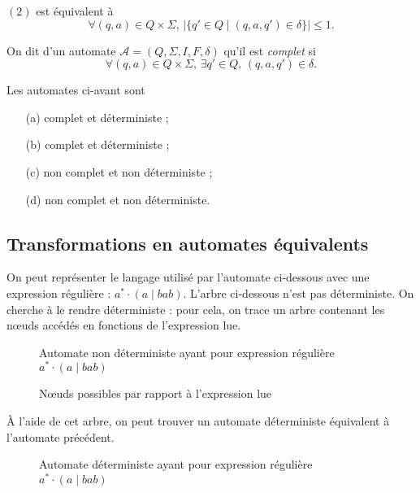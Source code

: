 \begin{rmk}
	$(2)$\/ est équivalent à \[
		\forall (q,a) \in Q \times \Sigma,\,\big|\{q' \in Q  \mid (q,a,q') \in \delta\}\big| \le 1
	.\]
\end{rmk}

\begin{defn}
	On dit d'un automate $\mathcal{A} = (Q, \Sigma, I, F, \delta)$ qu'il est {\it complet}\/ si \[
		\forall (q,a) \in Q\times \Sigma,\,\exists q' \in Q,\,(q,a,q') \in \delta
	.\]
\end{defn}

\begin{exm}
	Les automates ci-avant sont
	\begin{enumerate}
		\item[(a)] complet et déterministe ;
		\item[(b)] complet et déterministe ;
		\item[(c)] non complet et non déterministe ;
		\item[(d)] non complet et non déterministe.
	\end{enumerate}
\end{exm}

\subsection{Transformations en automates équivalents}

On peut représenter le langage utilisé par l'automate ci-dessous avec une expression régulière : $a^* \cdot (a  \mid bab)$. L'arbre ci-dessous n'est pas déterministe. On cherche à le rendre déterministe : pour cela, on trace un arbre contenant les nœuds accédés en fonctions de l'expression lue.
\begin{figure}[H]
	\centering
	\caption{Automate non déterministe ayant pour expression régulière $a^* \cdot (a  \mid bab)$}
\end{figure}

\begin{figure}[H]
	\centering
	{\small{}}
	\caption{Nœuds possibles par rapport à l'expression lue}
\end{figure}

À l'aide de cet arbre, on peut trouver un automate déterministe équivalent à l'automate précédent.

\begin{figure}[H]
	\centering
	{}
	\caption{Automate déterministe ayant pour expression régulière $a^* \cdot (a  \mid  bab)$}
\end{figure}


